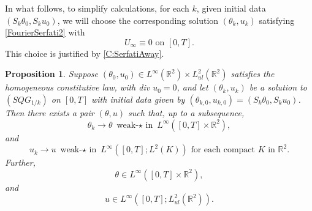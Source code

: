 \documentclass[11pt,reqno,xcolor=svgnames]{amsart}
\def\R{{\mathbb R}}
\theoremstyle{plain}
\newtheorem{prop}[theorem]{Proposition}
\theoremstyle{definition}
\theoremstyle{plain}
\theoremstyle{remark}
\begin{document}
In what follows, to simplify calculations, for each $k$, given initial data $(S_k\theta_0, S_ku_0)$, we will choose the corresponding solution $(\theta_k, u_k)$ satisfying \cref{FourierSerfati2} with 
\begin{equation}\label{Uequals0}
U_{\infty}\equiv 0 \text{ on } [0,T].
\end{equation}
This choice is justified by \cref{C:SerfatiAway}. 

\begin{prop}\label{prop:existence-of-limit-of-theta-u}
     Suppose $(\theta_0,u_0) \in L^{\infty}(\R^2)\times L^2_{ul}(\R^2)$ satisfies the homogeneous constitutive law, with div $u_0=0$, and let $(\theta_k,u_k)$ be a solution to $(SQG_{1/k})$ on $[0,T]$ with initial data given by $(\theta_{k,0},u_{k,0})=(S_k\theta_{0}, S_k u_{0})$. Then there exists a pair $(\theta,u)$ such that, up to a subsequence, $$\theta_k\rightarrow\theta \text{ weak-$\star$ in }L^{\infty}([0,T]\times \R^2),$$ and 
     $$u_k \rightarrow u \text{ weak-$\star$ in }L^{\infty}([0,T]; L^2(K)) \text{ for each compact $K$ in $\R^2$}.$$ Further, $$\theta \in L^\infty([0,T]\times\R^2),$$ and $$u \in L^{\infty}([0,T];L^2_{ul}(\R^2)).$$
\end{prop}
\end{document}
